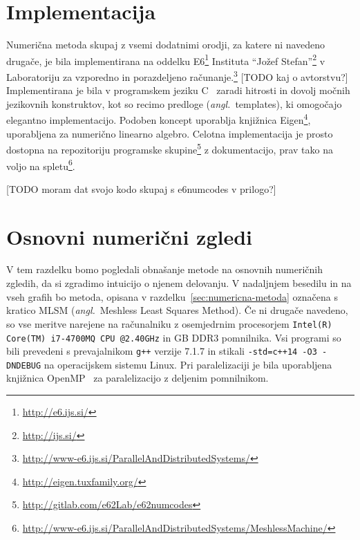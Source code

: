 \documentclass[12pt,a4paper,twoside]{article}
\theoremstyle{definition} %
\theoremstyle{plain} %
\numberwithin{equation}{section}
\newcommand{\ang}[1]{(\textit{angl.}\ #1)}
\newcommand{\CC}{C\nolinebreak\hspace{-.05em}\raisebox{.4ex}{\tiny\bf +}\nolinebreak\hspace{-.10em}\raisebox{.4ex}{\tiny\bf +}}
\begin{document}
\section{Implementacija}
\label{sec:implementacija}
Numerična metoda skupaj z vsemi dodatnimi orodji, za katere ni navedeno drugače, je bila
implementirana na oddelku E6\footnote{\url{http://e6.ijs.si/}} Instituta ``Jožef Stefan''\footnote{\url{http://ijs.si/}}
v Laboratoriju za vzporedno in porazdeljeno
računanje.\footnote{\url{http://www-e6.ijs.si/ParallelAndDistributedSystems/}}
[TODO kaj o avtorstvu?] Implementirana je bila v programskem jeziku
\CC~\cite{stroustrup1995c++} zaradi hitrosti in dovolj močnih jezikovnih konstruktov,
kot so recimo predloge \ang{templates}, ki omogočajo elegantno implementacijo.
Podoben koncept uporablja knjižnica Eigen\footnote{\url{http://eigen.tuxfamily.org/}},
uporabljena za numerično linearno algebro. Celotna implementacija je prosto dostopna
na repozitoriju programske skupine\footnote{\url{http://gitlab.com/e62Lab/e62numcodes}}
z dokumentacijo, prav tako na voljo na
spletu\footnote{\url{http://www-e6.ijs.si/ParallelAndDistributedSystems/MeshlessMachine/}}.

[TODO moram dat svojo kodo skupaj s e6numcodes v prilogo?]

\section{Osnovni numerični zgledi}
\label{sec:osnovni-zgledi}
V tem razdelku bomo pogledali obnašanje metode na osnovnih numeričnih zgledih, da si zgradimo
intuicijo o njenem delovanju. V nadaljnjem besedilu in na vseh grafih bo metoda, opisana v
razdelku~\ref{sec:numericna-metoda} označena s kratico MLSM \ang{Meshless Least Squares Method}.  Če
ni drugače navedeno, so vse meritve narejene na računalniku z osemjedrnim procesorjem
\verb|Intel(R) Core(TM) i7-4700MQ CPU @2.40GHz| in \unit[16]{GB} DDR3 pomnilnika. Vsi programi so
bili prevedeni s prevajalnikom \verb|g++| verzije 7.1.7 in stikali \verb|-std=c++14 -O3 -DNDEBUG| na
operacijskem sistemu Linux.  Pri paralelizaciji je bila uporabljena knjižnica
OpenMP~\cite{dagum1998openmp} za paralelizacijo z deljenim pomnilnikom.
\end{document}
